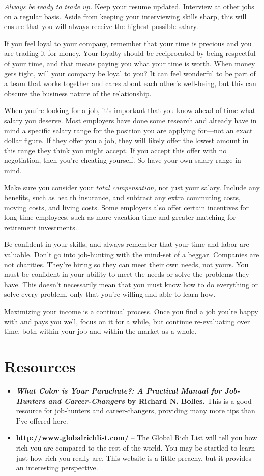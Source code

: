 \emph{Always be ready to trade up.} Keep your resume updated. Interview at other jobs on a regular basis. Aside from keeping your interviewing skills sharp, this will ensure that you will always receive the highest possible salary.

If you feel loyal to your company, remember that your time is precious and you are trading it for money. Your loyalty should be reciprocated by being respectful of your time, and that means paying you what your time is worth. When money gets tight, will your company be loyal to you? It can feel wonderful to be part of a team that works together and cares about each other's well-being, but this can obscure the business nature of the relationship.

When you're looking for a job, it's important that you know ahead of time what salary you deserve. Most employers have done some research and already have in mind a specific salary range for the position you are applying for---not an exact dollar figure. If they offer you a job, they will likely offer the lowest amount in this range they think you might accept. If you accept this offer with no negotiation, then you're cheating yourself. So have your own salary range in mind.

Make sure you consider your \emph{total compensation,} not just your salary. Include any benefits, such as health insurance, and subtract any extra commuting costs, moving costs, and living costs. Some employers also offer certain incentives for long-time employees, such as more vacation time and greater matching for retirement investments.

Be confident in your skills, and always remember that your time and labor are valuable. Don't go into job-hunting with the mind-set of a beggar. Companies are not charities. They're hiring so they can meet their own needs, not yours. You must be confident in your ability to meet the needs or solve the problems they have. This doesn't necessarily mean that you must know how to do everything or solve every problem, only that you're willing and able to learn how.

Maximizing your income is a continual process. Once you find a job you're happy with and pays you well, focus on it for a while, but continue re-evaluating over time, both within your job and within the market as a whole.

\newpage
\section{Resources}
\begin{itemize}
\item \textbf{\emph{What Color is Your Parachute?: A Practical Manual for Job-Hunters and Career-Changers} by Richard N. Bolles.} This is a good resource for job-hunters and career-changers, providing many more tips than I've offered here.

\item \textbf{\url{http://www.globalrichlist.com/}} -- The Global Rich List will tell you how rich you are compared to the rest of the world. You may be startled to learn just how rich you really are. This website is a little preachy, but it provides an interesting perspective.
\end{itemize}
